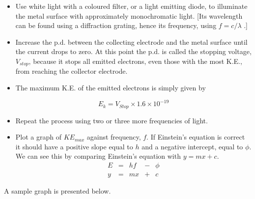\begin{itemize}
\item Use white light with a coloured filter, or a light emitting diode, to illuminate the metal surface with approximately monochromatic light. [Its wavelength can be found using a diffraction grating, hence its frequency, using $f = c / \lambda$ .]
\item Increase the p.d. between the collecting electrode and the metal surface until the current drops to zero. 
At this point the p.d. is called the stopping voltage, $V_{stop}$, because it stops all emitted electrons, even those with the most K.E., from reaching the collector electrode.

\item The maximum K.E. of the emitted electrons is simply given by 

\[ E_{k} = V_{Stop} \times 1.6 \times 10^{-19} \]


\item Repeat the process using two or three more frequencies of light.
\item Plot a graph of $KE_{max}$ against frequency, $f$. If Einstein's equation is correct it should have a positive slope equal to $h$ and a negative intercept, equal to $ \phi $. We can see this by comparing Einstein's equation with $y = mx + c$.
\begin{align*}
E &= &hf &-& \phi \\
y &= &mx& + &c
\end{align*}
\end{itemize}

A sample graph is presented below.

